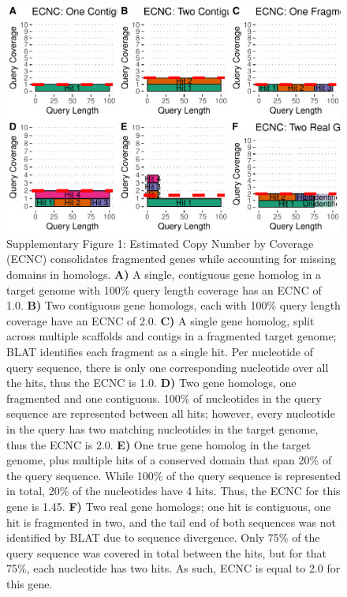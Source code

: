 \documentclass[10pt,letterpaper]{article}
\begin{document}
\begin{figure}
\centering
\includegraphics{paper_PLOS_draft_files/figure-latex/Supplementary Figure 1-1.pdf}
\caption{Supplementary Figure 1: Estimated Copy Number by Coverage
(ECNC) consolidates fragmented genes while accounting for missing
domains in homologs. \textbf{A)} A single, contiguous gene homolog in a
target genome with 100\% query length coverage has an ECNC of 1.0.
\textbf{B)} Two contiguous gene homologs, each with 100\% query length
coverage have an ECNC of 2.0. \textbf{C)} A single gene homolog, split
across multiple scaffolds and contigs in a fragmented target genome;
BLAT identifies each fragment as a single hit. Per nucleotide of query
sequence, there is only one corresponding nucleotide over all the hits,
thus the ECNC is 1.0. \textbf{D)} Two gene homologs, one fragmented and
one contiguous. 100\% of nucleotides in the query sequence are
represented between all hits; however, every nucleotide in the query has
two matching nucleotides in the target genome, thus the ECNC is 2.0.
\textbf{E)} One true gene homolog in the target genome, plus multiple
hits of a conserved domain that span 20\% of the query sequence. While
100\% of the query sequence is represented in total, 20\% of the
nucleotides have 4 hits. Thus, the ECNC for this gene is 1.45.
\textbf{F)} Two real gene homologs; one hit is contiguous, one hit is
fragmented in two, and the tail end of both sequences was not identified
by BLAT due to sequence divergence. Only 75\% of the query sequence was
covered in total between the hits, but for that 75\%, each nucleotide
has two hits. As such, ECNC is equal to 2.0 for this gene.}
\end{figure}
\end{document}
